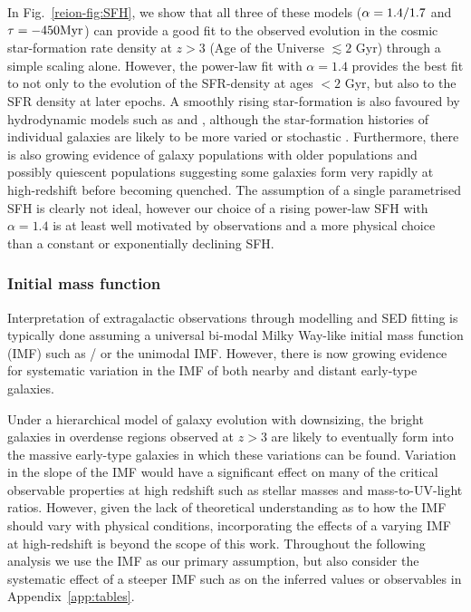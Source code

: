In Fig.~\ref{reion-fig:SFH}, we show that all three of these models ($\alpha \/ = \/ 1.4/1.7$ and $\tau = -450 \rm{Myr}$) can provide a good fit to the observed evolution in the cosmic star-formation rate density at $z > 3$ (Age of the Universe $\lesssim 2$ Gyr) through a simple scaling alone. However, the power-law fit with $\alpha = 1.4$ provides the best fit to not only to the evolution of the SFR-density at ages $< 2$ Gyr, but also to the SFR density at later epochs. A smoothly rising star-formation is also favoured by hydrodynamic models such as \citet{2011MNRAS.410.1703F} and \citet{Dayal:2013jm}, although the star-formation histories of individual galaxies are likely to be more varied or stochastic \citep{Dayal:2013jm,Kimm:2014gv}. Furthermore, there is also growing evidence of galaxy populations with older populations and possibly quiescent populations \citep{Nayyeri:2014cz,Spitler:2014ey} suggesting some galaxies form very rapidly at high-redshift before becoming quenched. The assumption of a single parametrised SFH is clearly not ideal, however our choice of a rising power-law SFH with $\alpha = 1.4$ is at least well motivated by observations and a more physical choice than a constant or exponentially declining SFH.
    
\subsubsection{Initial mass function}
Interpretation of extragalactic observations through modelling and SED fitting is typically done assuming a universal bi-modal Milky Way-like initial mass function (IMF) such as \citet{Kroupa:2001ki}/\citet{Chabrier:2003ki} or the unimodal \citet{Salpeter:1955hz} IMF. However, there is now growing evidence for systematic variation in the IMF of both nearby \citep{vanDokkum:2010ha,Treu:2010kf,Cappellari:2012jm,Conroy:2012bn,Ferreras:2013id} and distant \citep{MartinNavarro:2014wr} early-type galaxies. 

Under a hierarchical model of galaxy evolution with downsizing, the bright galaxies in overdense regions observed at $z > 3$ are likely to eventually form into the massive early-type galaxies in which these variations can be found. Variation in the slope of the IMF would have a significant effect on many of the critical observable properties at high redshift such as stellar masses and mass-to-UV-light ratios. However, given the lack of theoretical understanding as to how the IMF should vary with physical conditions, incorporating the effects of a varying IMF at high-redshift is beyond the scope of this work. Throughout the following analysis we use the \citet{Chabrier:2003ki} IMF as our primary assumption, but also consider the systematic effect of a steeper IMF such as \citet{Salpeter:1955hz} on the inferred values or observables in Appendix~\ref{app:tables}. 


